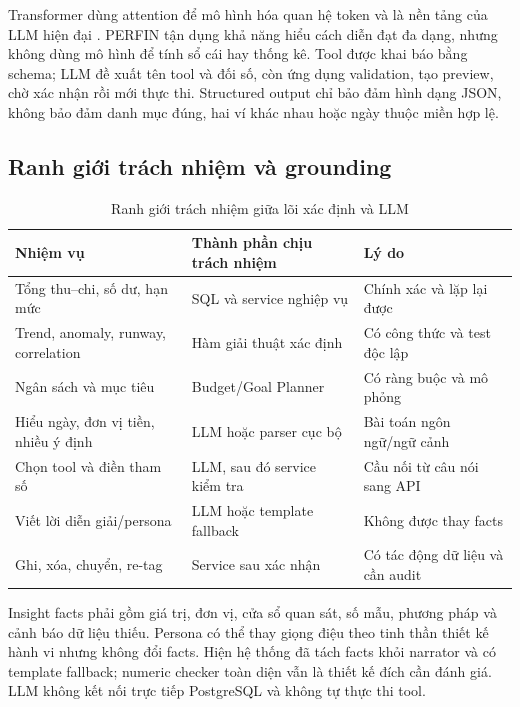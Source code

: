 Transformer dùng attention để mô hình hóa quan hệ token và là nền tảng
của LLM hiện đại \cite{vaswani2017}. PERFIN tận dụng khả năng hiểu cách
diễn đạt đa dạng, nhưng không dùng mô hình để tính sổ cái hay thống kê.
Tool được khai báo bằng schema; LLM đề xuất tên tool và đối số, còn ứng
dụng validation, tạo preview, chờ xác nhận rồi mới thực thi. Structured
output chỉ bảo đảm hình dạng JSON, không bảo đảm danh mục đúng, hai ví
khác nhau hoặc ngày thuộc miền hợp lệ.

\subsection{Ranh giới trách nhiệm và grounding}

\begin{table}[htbp]
  \centering
  \caption{Ranh giới trách nhiệm giữa lõi xác định và LLM}
  \label{tab:llm-responsibility}
  \small
  \begin{tabularx}{\textwidth}{|p{3.8cm}|p{4.0cm}|X|}
    \hline
    \textbf{Nhiệm vụ} & \textbf{Thành phần chịu trách nhiệm} &
    \textbf{Lý do} \\ \hline
    Tổng thu--chi, số dư, hạn mức & SQL và service nghiệp vụ & Chính
    xác và lặp lại được \\ \hline
    Trend, anomaly, runway, correlation & Hàm giải thuật xác định & Có
    công thức và test độc lập \\ \hline
    Ngân sách và mục tiêu & Budget/Goal Planner & Có ràng buộc và mô
    phỏng \\ \hline
    Hiểu ngày, đơn vị tiền, nhiều ý định & LLM hoặc parser cục bộ & Bài
    toán ngôn ngữ/ngữ cảnh \\ \hline
    Chọn tool và điền tham số & LLM, sau đó service kiểm tra & Cầu nối
    từ câu nói sang API \\ \hline
    Viết lời diễn giải/persona & LLM hoặc template fallback & Không
    được thay facts \\ \hline
    Ghi, xóa, chuyển, re-tag & Service sau xác nhận & Có tác động dữ
    liệu và cần audit \\ \hline
  \end{tabularx}
\end{table}

Insight facts phải gồm giá trị, đơn vị, cửa sổ quan sát, số mẫu, phương
pháp và cảnh báo dữ liệu thiếu. Persona có thể thay giọng điệu theo tinh
thần thiết kế hành vi \cite{thaler2009} nhưng không đổi facts. Hiện hệ
thống đã tách facts khỏi narrator và có template fallback; numeric
checker toàn diện vẫn là thiết kế đích cần đánh giá. LLM không kết nối
trực tiếp PostgreSQL và không tự thực thi tool.

